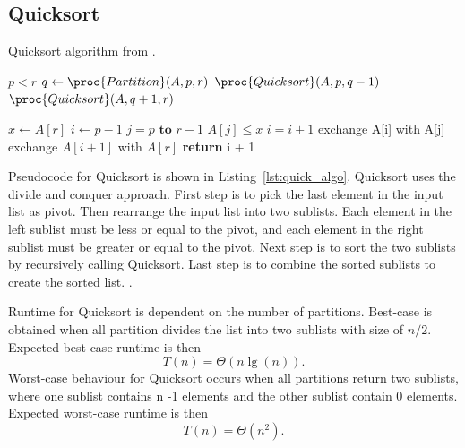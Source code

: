 \documentclass[sigconf, nonacm, natbib, screen, balance=False]{acmart}
\begin{document}
\subsection{Quicksort }\label{sec:algo4}
\begin{listing}
	  \caption{Quicksort algorithm from \citet[Ch.~7.1]{CLRS_2009}.}
	  \label{lst:quick_algo}
	  \begin{codebox}
	     \li \If $p<r$
		\Do
		\li$q \gets \proc{Partition}(A,p,r)$
		\li $\proc{Quicksort}(A,p,q-1)$
		\li $\proc{Quicksort}(A,q+1,r)$
		\End
	  \end{codebox}
	  \begin{codebox}
		\Procname{$\proc{Partition}(A,p,q,r)$}
		\li $x \gets A[r]$
		\li $i \gets p-1$
		\li \For $ j= p \textbf{ to } r-1$
		\Do
		\li \If $A[j] \leq x$
		\Do
		\li $i = i+1$
		\li exchange A[i] with A[j]
		\End
		\End
		\li exchange $A[i+1]$ with $A[r]$
		\li \textbf{return} i + 1
	  \end{codebox}
\end{listing}
\FloatBarrier
Pseudocode for Quicksort is shown in Listing~\ref{lst:quick_algo}. Quicksort uses the divide and conquer approach. First step is to pick the last element in the input list as pivot. Then rearrange the input list into two sublists. Each element in the left sublist must be less or equal to the pivot, and each element in the right sublist must be greater or equal to the pivot. Next step is to sort the two sublists by recursively calling Quicksort. Last step is to combine the sorted sublists to create the sorted list. \citet{CLRS_2009}.

Runtime for Quicksort is dependent on the number of partitions. Best-case is obtained when all partition divides the list into two sublists with size of $n/2$. Expected best-case runtime is then
\begin{equation*}
T(n) = \Theta(n\lg(n)).
\end{equation*} 
Worst-case behaviour for Quicksort occurs when all partitions return two sublists, where one sublist contains n -1 elements and the other sublist contain 0 elements. Expected worst-case runtime is then
\begin{equation*}
T(n)=\Theta(n^2).
\end{equation*}
\citet{CLRS_2009}
\end{document}
